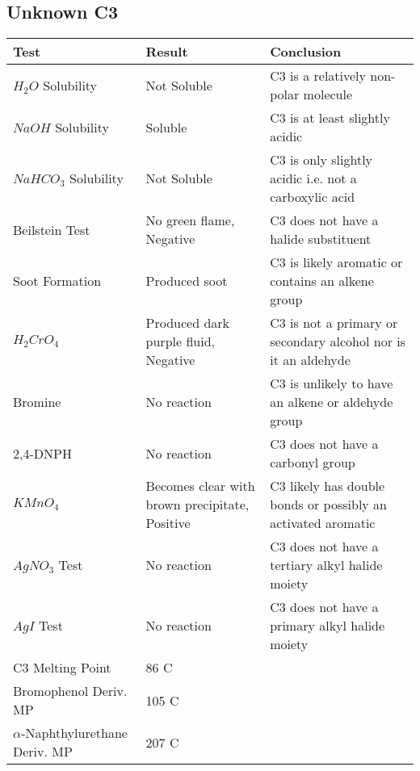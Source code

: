 \documentclass{article}
\begin{document}
	\subsection{Unknown C3}
	\begin{table}[h]
		
		\begin{tabular}{ l  p{3.0cm} p{5.4cm} } 
			\toprule
			\textbf{Test} & \textbf{Result} & \textbf{Conclusion} \\\midrule
			
			$H_2O$ Solubility & Not Soluble & C3 is a relatively non-polar molecule \\\hline
			
			$NaOH$ Solubility & Soluble & C3 is at least slightly acidic \\\hline
			
			$NaHCO_3$ Solubility & Not Soluble & C3 is only slightly acidic i.e. not a carboxylic acid\\\hline
			
			Beilstein Test & No green flame, Negative & C3 does not have a halide substituent \\\hline
			
			Soot Formation & Produced soot & C3 is likely aromatic or contains an alkene group \\\hline
			
			$H_2CrO_4$ & Produced dark purple fluid, Negative & C3 is not a primary or secondary alcohol nor is it an aldehyde \\\hline
			
			Bromine & No reaction & C3 is unlikely to have an alkene or aldehyde group \\\hline 
			
			2,4-DNPH & No reaction & C3 does not have a carbonyl group \\\hline 
			
			$KMnO_4$ & Becomes clear with brown precipitate, Positive & C3 likely has double bonds or possibly an activated aromatic \\\hline  
			
			$AgNO_3$ Test & No reaction & C3 does not have a tertiary alkyl halide moiety \\\hline 
			
			$AgI$ Test & No reaction & C3 does not have a primary alkyl halide moiety \\\hline 
			
			C3 Melting Point & 86 C &  \\\hline
			
			Bromophenol Deriv. MP & 105 C &  \\\hline
			
			$\alpha$-Naphthylurethane Deriv. MP & 207 C &  \\\hline
			
		\end{tabular}
	\end{table}
	\pagebreak
\end{document}

